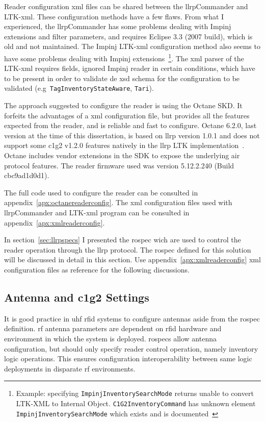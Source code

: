 Reader configuration \ac{xml} files can be shared between the \acs{llrp}Commander and LTK-\ac{xml}. These configuration methods have a few flaws. From what I experienced, the \ac{llrp}Commander has some problems dealing with Impinj extensions and filter parameters, and requires Eclipse $3.3$ (2007 build), which is old and not maintained.
The Impinj LTK-\ac{xml} configuration method also seems to have some problems dealing with Impinj extensions~\footnote{Example: specifying \texttt{ImpinjInventorySearchMode} returns unable to convert LTK-XML to Internal Object. \texttt{C1G2InventoryCommand} has unknown element \texttt{ImpinjInventorySearchMode} which exists and is documented~\cite{ImpinjLTKProgrammers}}.
The \ac{xml} parser of the LTK-\acs{xml} requires fields, ignored Impinj reader in certain conditions, which have to be present in order to validate de \ac{xsd} schema for the configuration to be validated (e.g\ \texttt{TagInventoryStateAware}, \texttt{Tari}).

The approach suggested to configure the reader is using the Octane SKD. It forfeits the advantages of a \ac{xml} configuration file, but provides all the features expected from the reader, and is reliable and fast to configure.
Octane 6.2.0, last version at the time of this dissertation, is based on \ac{llrp} version 1.0.1 and does not support some \ac{c1g2} v1.2.0 features natively in the \ac{llrp} LTK implementation~\cite{ImpinjOctaneLLRP}. Octane includes vendor extensions in the SDK to expose the underlying air protocol features.
The reader firmware used was version 5.12.2.240 (Build cbc9ad1d0d1).

The full code used to configure the reader can be consulted in appendix~\ref{apx:octanereaderconfig}.
The \ac{xml} configuration files used with \ac{llrp}Commander and LTK-\acs{xml} program can be consulted in appendix~\ref{apx:xmlreaderconfig}.

In section~\ref{sec:llrpspecs} I presented the \ac{rospec} wich are used to control the reader operation through the \ac{llrp} protocol. The \ac{rospec} defined for this solution will be discussed in detail in this section.
Use appendix~\ref{apx:xmlreaderconfig} \ac{xml} configuration files as reference for the following discussions.

\subsection{Antenna and \acs{c1g2} Settings}

It is good practice in \ac{uhf} \ac{rfid} systems to configure antennas aside from the \ac{rospec} definition. \ac{rf} antenna parameters are dependent on \ac{rfid} hardware and environment in which the system is deployed. \acp{rospec} allow antenna configuration, but should only specify reader control operation, namely inventory logic operations. This ensures configuration interoperability between same logic deployments in disparate \ac{rf} environments.

